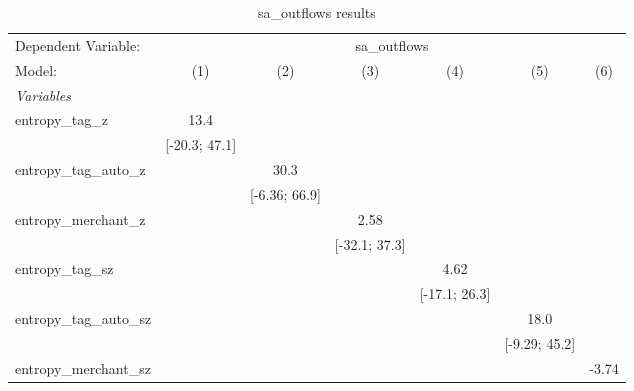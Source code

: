 
\begin{table}[htbp]
   \centering
   \tiny
   \begin{threeparttable}[b]
      \caption{\label{tab:reg_sa_outflows_full.tex} sa\_outflows results}
      \begin{tabular}{lcccccc}
         \tabularnewline \midrule \midrule
         Dependent Variable: & \multicolumn{6}{c}{sa\_outflows}\\
         Model:                    & (1)             & (2)             & (3)             & (4)             & (5)             & (6)\\  
         \midrule
         \emph{Variables}\\
         entropy\_tag\_z           & 13.4            &                 &                 &                 &                 &   \\   
                                   & [-20.3; 47.1]   &                 &                 &                 &                 &   \\   
         entropy\_tag\_auto\_z     &                 & 30.3            &                 &                 &                 &   \\   
                                   &                 & [-6.36; 66.9]   &                 &                 &                 &   \\   
         entropy\_merchant\_z      &                 &                 & 2.58            &                 &                 &   \\   
                                   &                 &                 & [-32.1; 37.3]   &                 &                 &   \\   
         entropy\_tag\_sz          &                 &                 &                 & 4.62            &                 &   \\   
                                   &                 &                 &                 & [-17.1; 26.3]   &                 &   \\   
         entropy\_tag\_auto\_sz    &                 &                 &                 &                 & 18.0            &   \\   
                                   &                 &                 &                 &                 & [-9.29; 45.2]   &   \\   
         entropy\_merchant\_sz     &                 &                 &                 &                 &                 & -3.74\\   

\end{tabular}
\end{threeparttable}
\end{table}
